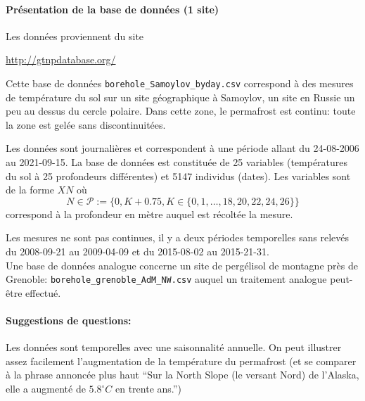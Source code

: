 \documentclass[a4paper,12pt]{article}
\theoremstyle{exercice}
\begin{document}
\paragraph{Présentation de la base de données (1 site)} Les données proviennent du site 

\begin{center}\url{http://gtnpdatabase.org/}\end{center}




Cette base de données \texttt{borehole\_Samoylov\_byday.csv} correspond à des mesures de température du sol sur un site géographique à Samoylov, un site en Russie un peu au dessus du cercle polaire. Dans cette zone, le permafrost est continu: toute la zone est gelée sans discontinuitées.


 Les données sont journalières et correspondent à une période allant du 24-08-2006 au 2021-09-15. 
 La base de données est constituée de 25 variables (températures du sol à 25 profondeurs différentes) et 5147 individus (dates). Les variables sont de la forme $XN$ où $$N\in \mathcal P:=\big\{0, K+0.75, K\in\{0,1,\ldots, 18,20,22,24,26\} \big\}$$ correspond à la profondeur en mètre auquel est récoltée la mesure.
 
 
 
 Les mesures ne sont pas continues, il y a deux périodes temporelles sans relevés du 2008-09-21 au 2009-04-09 et du 2015-08-02 au 2015-21-31.\\
 
Une base de données analogue concerne un site de pergélisol de montagne   près de Grenoble: \texttt{borehole\_grenoble\_AdM\_NW.csv} auquel un traitement analogue peut-être effectué.



\paragraph{Suggestions de questions:} Les données sont temporelles avec une  saisonnalité annuelle. On peut illustrer assez facilement l'augmentation de la température du permafrost (et se comparer à la phrase annoncée plus haut ``Sur la North Slope (le versant Nord) de l’Alaska, elle a augmenté de $5.8^{\circ}C$ en trente ans.'')
\end{document}
